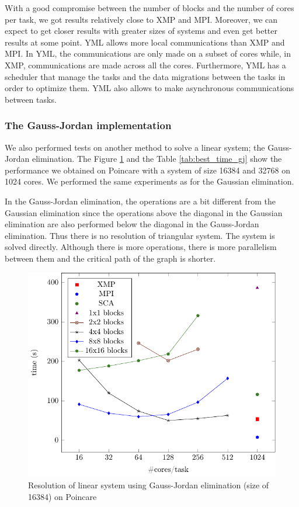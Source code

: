 With a good compromise between the number of blocks and the number of cores per task, we got results relatively close to XMP and MPI.
Moreover, we can expect to get closer results with greater sizes of systems and even get better results at some point.
YML allows more local communications than XMP and MPI.
In YML, the communications are only made on a subset of cores while, in XMP, communications are made across all the cores.
Furthermore, YML has a scheduler that manage the tasks and the data migrations between the tasks in order to optimize them.
YML also allows to make asynchronous communications between tasks.

\subsubsection{The Gauss-Jordan implementation}
We also performed tests on another method to solve a linear system; the Gauss-Jordan elimination.
The Figure \ref{fig:gj} and the Table \ref{tab:best_time_gj} show the performance we obtained on Poincare with a system of size 16384 and 32768 on 1024 cores.
We performed the same experiments as for the Gaussian elimination.

In the Gauss-Jordan elimination, the operations are a bit different from the Gaussian elimination since the operations above the diagonal in the Gaussian elimination are also performed below the diagonal in the Gauss-Jordan elimination.
Thus there is no resolution of triangular system.
The system is solved directly.
Although there is more operations, there is more parallelism between them and the critical path of the graph is shorter.

\begin{figure}
	\caption{Resolution of linear system using Gauss-Jordan elimination (size of 16384) on Poincare\label{fig:gj}}
	\centering
	\includegraphics[width=.49\textwidth]{fig-gj-16k.pdf}
\end{figure}

